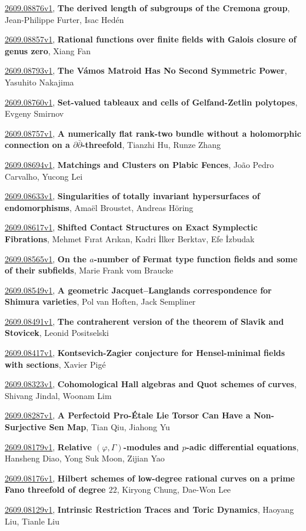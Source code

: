 \documentclass[9pt, a4paper]{article}
\theoremstyle{plain}
\theoremstyle{definition}
\theoremstyle{remark}
\newcommand{\arxiv}[3]{\href{https://arxiv.org/abs/#1}{#1}, \textbf{\textcolor{arxivblue}{#2}}, #3}
\begin{document}
\arxiv{2609.08876v1}{The derived length of subgroups of the Cremona group}{Jean-Philippe Furter, Isac Hedén}

\arxiv{2609.08857v1}{Rational functions over finite fields with Galois closure of genus zero}{Xiang Fan}

\arxiv{2609.08793v1}{The Vámos Matroid Has No Second Symmetric Power}{Yasuhito Nakajima}

\arxiv{2609.08760v1}{Set-valued tableaux and cells of Gelfand-Zetlin polytopes}{Evgeny Smirnov}

\arxiv{2609.08757v1}{A numerically flat rank-two bundle without a holomorphic connection on a $\partial\bar\partial$-threefold}{Tianzhi Hu, Runze Zhang}

\arxiv{2609.08694v1}{Matchings and Clusters on Plabic Fences}{João Pedro Carvalho, Yucong Lei}

\arxiv{2609.08633v1}{Singularities of totally invariant hypersurfaces of endomorphisms}{Amaël Broustet, Andreas Höring}

\arxiv{2609.08617v1}{Shifted Contact Structures on Exact Symplectic Fibrations}{Mehmet Fırat Arıkan, Kadri İlker Berktav, Efe İzbudak}

\arxiv{2609.08565v1}{On the $a$-number of Fermat type function fields and some of their subfields}{Marie Frank vom Braucke}

\arxiv{2609.08549v1}{A geometric Jacquet--Langlands correspondence for Shimura varieties}{Pol van Hoften, Jack Sempliner}

\arxiv{2609.08491v1}{The contraherent version of the theorem of Slavik and Stovicek}{Leonid Positselski}

\arxiv{2609.08417v1}{Kontsevich-Zagier conjecture for Hensel-minimal fields with sections}{Xavier Pigé}

\arxiv{2609.08323v1}{Cohomological Hall algebras and Quot schemes of curves}{Shivang Jindal, Woonam Lim}

\arxiv{2609.08287v1}{A Perfectoid Pro-Étale Lie Torsor Can Have a Non-Surjective Sen Map}{Tian Qiu, Jiahong Yu}

\arxiv{2609.08179v1}{Relative $(\varphi, Γ)$-modules and $p$-adic differential equations}{Hansheng Diao, Yong Suk Moon, Zijian Yao}

\arxiv{2609.08176v1}{Hilbert schemes of low-degree rational curves on a prime Fano threefold of degree $22$}{Kiryong Chung, Dae-Won Lee}

\arxiv{2609.08129v1}{Intrinsic Restriction Traces and Toric Dynamics}{Haoyang Liu, Tianle Liu}
\end{document}
